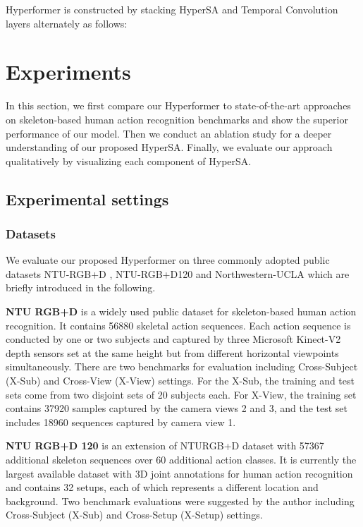 \documentclass[10pt,twocolumn,letterpaper]{article}
\begin{document}
Hyperformer is constructed by stacking HyperSA and Temporal Convolution layers alternately as follows:















\section{Experiments}
In this section, we first compare our Hyperformer to  state-of-the-art approaches on skeleton-based human action recognition benchmarks and show the superior performance of our model. 
Then we conduct an ablation study for a deeper understanding of our proposed HyperSA. Finally, we evaluate our approach qualitatively by visualizing each component of HyperSA.

\subsection{Experimental settings}
\subsubsection{Datasets}
\label{data}
We evaluate our proposed Hyperformer on three commonly adopted public datasets NTU-RGB+D \cite{shahroudy2016ntu}, NTU-RGB+D120 \cite{liu2019ntu} and Northwestern-UCLA \cite{wang2014cross} which are briefly introduced in the following. 



\noindent
\textbf{NTU RGB+D} 
\cite{shahroudy2016ntu} is a widely used public dataset for skeleton-based human action recognition. It contains
56880 skeletal action sequences. 
Each action sequence is conducted by one or two subjects and captured by three Microsoft Kinect-V2 depth sensors set at the same height but from different horizontal viewpoints simultaneously. 
There are two benchmarks for evaluation including Cross-Subject (X-Sub)
and Cross-View (X-View) settings. For the X-Sub, the training and test sets come from two disjoint sets of 20 subjects each. 
For X-View, the training set contains 37920 samples captured by the camera views 2 and 3, and the test set includes 18960 sequences captured by camera view 1. 


\noindent
\textbf{NTU RGB+D 120} \cite{liu2019ntu} is an extension of NTURGB+D dataset with 57367 additional skeleton sequences over 60 additional action classes.
It is currently the largest available dataset with 3D joint annotations for human action recognition and contains 32 setups, each of which represents a different location and background. Two benchmark evaluations were suggested by the author including Cross-Subject (X-Sub) and Cross-Setup (X-Setup) settings. 
\end{document}
